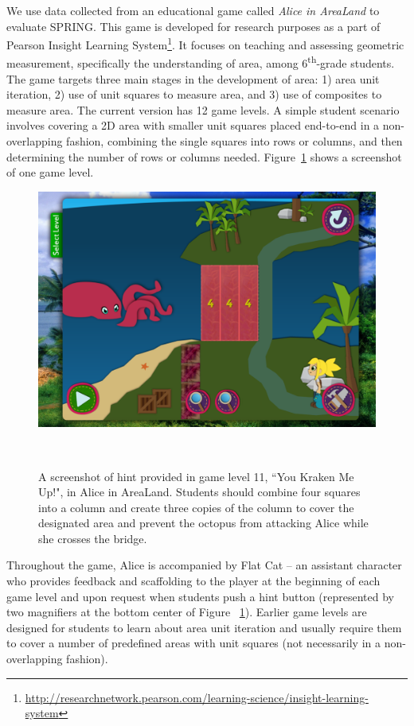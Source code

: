 \documentclass{sigchi}
\def\algname{SPRING\xspace}
\begin{document}
	
	We use data collected from an educational game called  \textit {Alice in AreaLand} to evaluate \algname.
	This game is developed for research purposes as a part of Pearson Insight Learning System\footnote{\url{http://researchnetwork.pearson.com/learning-science/insight-learning-system}}. 
	It focuses on teaching and assessing geometric measurement, specifically the understanding of area, among 6\textsuperscript{th}-grade students. 
	The game targets three main stages in the development of area: 1) area unit iteration, 2) use of unit squares to measure area, and 3) use of composites to measure area. 
	The current version has 12 game levels. 
	A simple student scenario involves covering a 2D area with smaller unit squares placed end-to-end in a non-overlapping fashion, combining the single squares into rows or columns, and then determining the number of rows or columns needed. 
	Figure~\ref{fig:figurekracken} shows a screenshot of one game level.
	
	\begin{figure}
		\centering
		\includegraphics[width=0.9\columnwidth]{figures/kracken}
		\caption{A screenshot of hint provided in game level 11, ``You Kraken Me Up!", in Alice in AreaLand. Students should combine four squares into a column and create three copies of the column to cover the designated area and prevent the octopus from attacking Alice while she crosses the bridge.}~\label{fig:figurekracken}
	\end{figure}
	
	Throughout the game,  Alice is accompanied by Flat Cat -- an assistant character who provides feedback and scaffolding to the player at the beginning of each game level and upon request when students push a hint button (represented by two magnifiers at the bottom center of Figure ~\ref{fig:figurekracken}).
	Earlier game levels are designed for students to learn about area unit iteration and usually require them to cover a number of predefined areas with unit squares (not necessarily in a non-overlapping fashion).
	 
\end{document}
